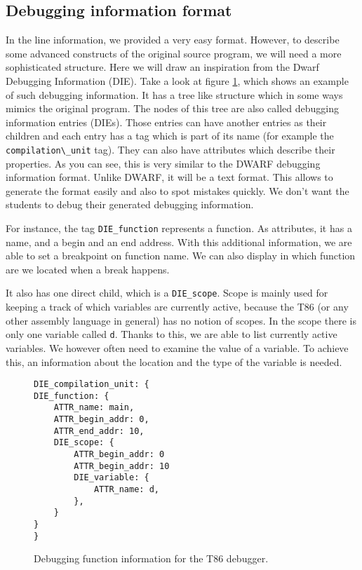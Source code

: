 \subsection{Debugging information format}
In the line information, we provided a very easy format. However, to describe
some advanced constructs of the original source program, we will need a more
sophisticated structure. Here we will draw an inspiration from the Dwarf
Debugging Information (DIE). Take a look at figure \ref{fig:t86dbg-die}, which
shows an example of such debugging information. It has a tree like structure
which in some ways mimics the original program. The nodes of this tree are also
called debugging information entries (DIEs). Those entries can have another
entries as their children and each entry has a tag which is part of its name
(for example the \verb|compilation\_unit| tag). They can also have attributes
which describe their properties. As you can see, this is very similar to the
DWARF debugging information format. Unlike DWARF, it will be a text format.
This allows to generate the format easily and also to spot mistakes quickly. We
don't want the students to debug their generated debugging information.

For instance, the tag \verb|DIE_function| represents a function. As attributes,
it has a name, and a begin and an end address. With this additional information,
we are able to set a breakpoint on function name. We can also display in which
function are we located when a break happens.

It also has one direct child, which is a \verb|DIE_scope|. Scope is mainly used
for keeping a track of which variables are currently active, because the T86
(or any other assembly language in general) has no notion of scopes. In the
scope there is only one variable called \texttt{d}. Thanks to this, we are able
to list currently active variables. We however often need to examine the value
of a variable. To achieve this, an information about the location and the
type of the variable is needed.

\begin{figure}
    \begin{lstlisting}
DIE_compilation_unit: {
DIE_function: {
    ATTR_name: main,
    ATTR_begin_addr: 0,
    ATTR_end_addr: 10,
    DIE_scope: {
        ATTR_begin_addr: 0
        ATTR_begin_addr: 10
        DIE_variable: {
            ATTR_name: d,
        },
    }
}
}
    \end{lstlisting}
    \caption{Debugging function information for the T86 debugger.}
    \label{fig:t86dbg-die}
\end{figure}

